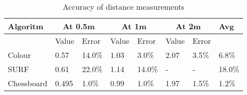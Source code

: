 \begin{table}
	\begin{center}
    	\begin{tabular}{ | p{1.1cm} | p{0.5cm} | p{0.6cm} | p{0.5cm} | p{0.6cm} | p{0.5cm} | p{0.6cm} | l |}
    	\hline
    	Algoritm & \multicolumn{2}{|c|}{At 0.5m} & \multicolumn{2}{|c|}{At 1m} & \multicolumn{2}{|c|}{At 2m} & Avg \\ \hline
    	& Value & Error & Value & Error & Value & Error & \\ \hline
		Colour & 0.57 & 14.0\% & 1.03 & 3.0\% & 2.07 & 3.5\% & 6.8\% \\ \hline
		SURF & 0.61 & 22.0\% & 1.14 & 14.0\% & - & - & 18.0\% \\ \hline
		Chessboard & 0.495 & 1.0\% & 0.99 & 1.0\% & 1.97 & 1.5\% & 1.2\% \\ \hline
    	\end{tabular}
	\end{center}
	
	\caption{Accuracy of distance measurements}
	\label{acc}
	
\end{table}